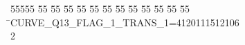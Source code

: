 %
%
\begin{tabbing}
55555 \= 55 \= 55 \= 55 \= 55 \= 55 \= 55 \= 55 \= 55 \= 55 \= 55 \= 55 \= 55 \= \>CURVE\_Q13\_FLAG\_1\_TRANS\_1=4120111512106\\[0pt]
2\>\end{tabbing}
